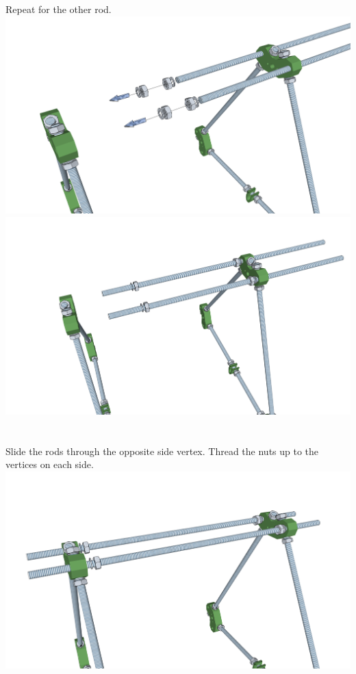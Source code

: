 \documentclass[twoside,a4paper,titlepage]{memoir}
\begin{document}
	\section{}
	Repeat for the other rod.\\
	\includegraphics[width=1\linewidth]{graphics/ch4_2_1.png}
	\includegraphics[width=1\linewidth]{graphics/ch4_2_2.png}
	
	\section{}
	Slide the rods through the opposite side vertex. Thread the nuts up to the vertices on each side.\\
	\includegraphics[width=1\linewidth]{graphics/ch4_3.png}
	
\end{document}
